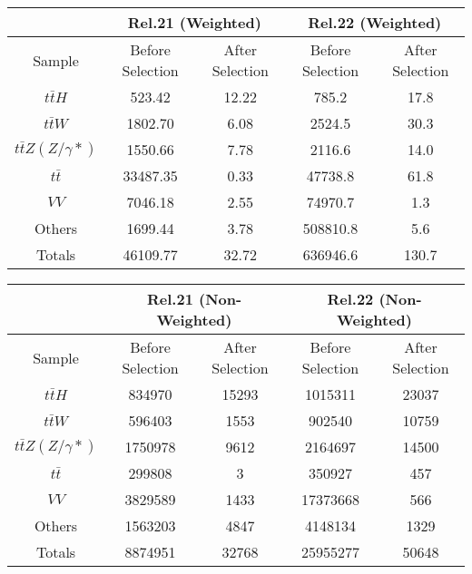 \begin{table}[ht!]
    \centering
    \begin{tabular}{|c|c|c|c|c|}
        \hline
         & \multicolumn{2}{c|}{Rel.21 (Weighted)} & \multicolumn{2}{c|}{Rel.22 (Weighted)} \\ \hline 
        Sample & Before Selection & After Selection & Before Selection & After Selection \\ \hline
        $t\bar{t}H$ & 523.42 & 12.22 & 785.2 & 17.8 \\ \hline
        $t\bar{t}W$ & 1802.70 & 6.08 & 2524.5 & 30.3 \\ \hline
        $t\bar{t}Z(Z/\gamma*)$ & 1550.66 & 7.78 & 2116.6 & 14.0 \\ \hline
        $t\bar{t}$ & 33487.35 & 0.33 & 47738.8 & 61.8 \\ \hline
        $VV$ & 7046.18 & 2.55 & 74970.7 & 1.3 \\ \hline
        Others & 1699.44 & 3.78 & 508810.8 & 5.6 \\ \hline\hline
        Totals & 46109.77 & 32.72 & 636946.6 & 130.7 \\ \hline
    \end{tabular}
\end{table}



\begin{table}[ht!]
    \centering
    \begin{tabular}{|c|c|c|c|c|}
        \hline
         & \multicolumn{2}{c|}{Rel.21 (Non-Weighted)} & \multicolumn{2}{c|}{Rel.22 (Non-Weighted)} \\ \hline 
        Sample & Before Selection & After Selection & Before Selection & After Selection \\ \hline
        $t\bar{t}H$ & 834970 & 15293 & 1015311 & 23037 \\ \hline
        $t\bar{t}W$ & 596403 & 1553 & 902540 & 10759 \\ \hline
        $t\bar{t}Z(Z/\gamma*)$ & 1750978 & 9612 & 2164697 & 14500 \\ \hline
        $t\bar{t}$ & 299808 & 3 & 350927 & 457 \\ \hline
        $VV$ & 3829589 & 1433 & 17373668 & 566 \\ \hline
        Others & 1563203 & 4847 & 4148134 & 1329 \\ \hline\hline
        Totals & 8874951 & 32768 & 25955277 & 50648 \\ \hline
    \end{tabular}
\end{table}



